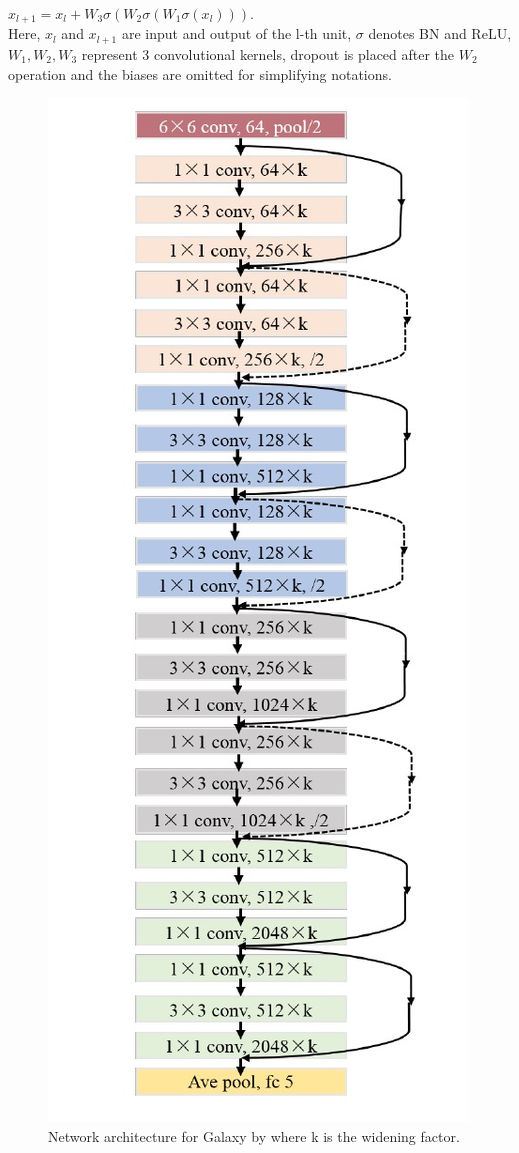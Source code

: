 \documentclass[a4paper,12pt]{report}
\begin{document}
$x_{l+1} = x_l + W_3\sigma(W_2\sigma(W_1\sigma(x_l))).$\\
\hspace*{0.5 in}Here, $x_l$ and $x_{l+1}$ are input and output of the l-th unit, $\sigma$ denotes BN and ReLU, $W_1,W_2,W_3$ represent 3 convolutional kernels, dropout is placed after the $W_2$ operation and the biases are omitted for simplifying notations.

\begin{figure}[H]
    \centering
    \includegraphics[height=0.95\textheight]{figures/DaiNetwork.jpeg}
    \caption{Network architecture for Galaxy by \citep{dai2018galaxy} where k is the widening factor.}
    \label{dainetwork}
\end{figure}
\end{document}

